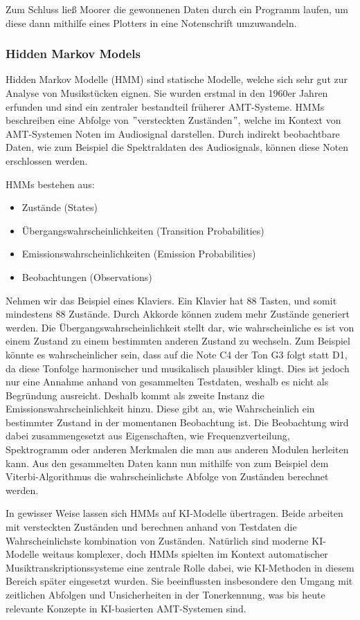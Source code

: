 Zum Schluss ließ Moorer die gewonnenen Daten durch ein Programm laufen, 
um diese dann mithilfe eines Plotters in eine Notenschrift umzuwandeln.

\subsubsection{Hidden Markov Models}
Hidden Markov Modelle (HMM) sind statische Modelle, welche sich sehr gut zur Analyse von Musikstücken eignen.
Sie wurden erstmal in den 1960er Jahren erfunden
\cite{baum1970maximization}
und sind ein zentraler bestandteil früherer AMT-Systeme.
HMMs beschreiben eine Abfolge von \("\)versteckten Zuständen\("\),
welche im Kontext von AMT-Systemen Noten im Audiosignal darstellen.
Durch indirekt beobachtbare Daten, wie zum Beispiel die Spektraldaten des Audiosignals,
können diese Noten erschlossen werden.

HMMs bestehen aus:
\begin{itemize}
    \item Zustände (States)
    \item Übergangswahrscheinlichkeiten (Transition Probabilities)
    \item Emissionswahrscheinlichkeiten (Emission Probabilities)
    \item Beobachtungen (Observations)
\end{itemize}
Nehmen wir das Beispiel eines Klaviers.
Ein Klavier hat 88 Tasten, und somit mindestens 88 Zustände.
Durch Akkorde können zudem mehr Zustände generiert werden.
Die Übergangswahrscheinlichkeit stellt dar,
wie wahrscheinliche es ist von einem Zustand zu einem bestimmten anderen Zustand zu wechseln.
Zum Beispiel könnte es wahrscheinlicher sein, dass auf die Note C4 der Ton G3 folgt statt D1,
da diese Tonfolge harmonischer und musikalisch plausibler klingt.
Dies ist jedoch nur eine Annahme anhand von gesammelten Testdaten, weshalb es nicht als Begründung ausreicht.
Deshalb kommt als zweite Instanz die Emissionswahrscheinlichkeit hinzu.
Diese gibt an, wie Wahrscheinlich ein bestimmter Zustand in der momentanen Beobachtung ist.
Die Beobachtung wird dabei zusammengesetzt aus Eigenschaften, wie Frequenzverteilung, Spektrogramm
oder anderen Merkmalen die man aus anderen Modulen herleiten kann.
Aus den gesammelten Daten kann nun mithilfe von zum Beispiel dem Viterbi-Algorithmus
\cite{takeda2002hidden}
die wahrscheinlichste Abfolge von Zuständen berechnet werden.

In gewisser Weise lassen sich HMMs auf KI-Modelle übertragen.
Beide arbeiten mit versteckten Zuständen und
berechnen anhand von Testdaten die Wahrscheinlichste kombination von Zuständen.
Natürlich sind moderne KI-Modelle weitaus komplexer,
doch HMMs spielten im Kontext automatischer Musiktranskriptionssysteme eine zentrale Rolle dabei,
wie KI-Methoden in diesem Bereich später eingesetzt wurden.
Sie beeinflussten insbesondere den Umgang mit zeitlichen Abfolgen
und Unsicherheiten in der Tonerkennung,
was bis heute relevante Konzepte in KI-basierten AMT-Systemen sind.

